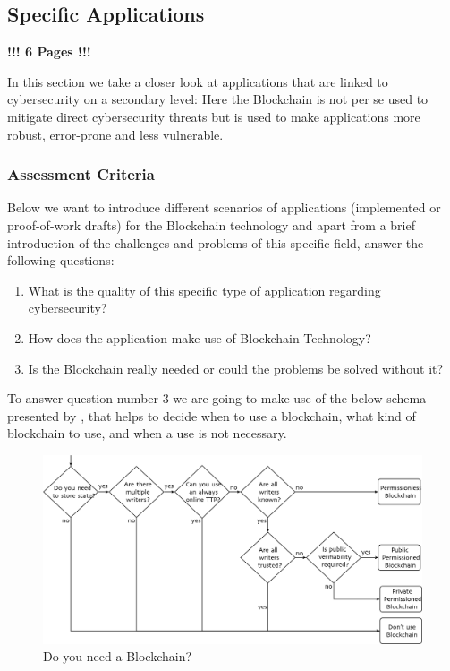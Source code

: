 \subsection{Specific Applications}
\label{subsec:03_applications}


\textbf{!!!  6 Pages  !!!}

In this section we take a closer look at applications that are linked to cybersecurity on a secondary level: Here the Blockchain is not per se used to mitigate direct cybersecurity threats but is used to make applications more robust, error-prone and less vulnerable.

\subsubsection{Assessment Criteria}
Below we want to introduce different scenarios of applications (implemented or proof-of-work drafts) for the Blockchain technology and apart from a brief introduction of the challenges and problems of this specific field, answer the following questions:
\begin{enumerate}
    \item What is the quality of this specific type of application regarding cybersecurity?
    \item How does the application make use of Blockchain Technology?
    \item Is the Blockchain really needed or could the problems be solved without it?
\end{enumerate}
To answer question number 3 we are going to make use of the below schema presented by \citeauthor{Wust2017}, that helps to decide when to use a blockchain, what kind of blockchain to use, and when a use is not necessary.
\begin{figure}[ht!]
  \begin{center}
  \includegraphics[scale=0.6]{Talk7/img/app/BCorNot}
     \end{center}
  \caption{Do you need a Blockchain?}
     \label{blockchain_or_not}
\end{figure}

